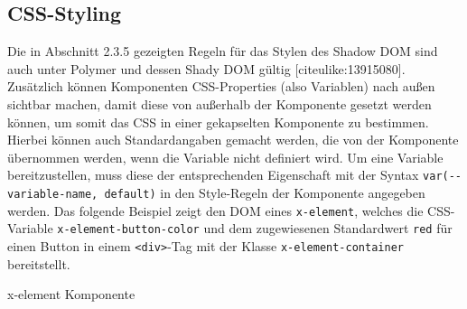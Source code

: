 \begin{Shaded}
\begin{Highlighting}[]
 \OperatorTok{=} \NormalTok{(}\VariableTok{$}\NormalTok{(}\OperatorTok{\{}
  \NormalTok{(}\NormalTok{)}\OperatorTok{;}
  \NormalTok{(}\NormalTok{)}\OperatorTok{;}
\OperatorTok{\}}\NormalTok{)}\OperatorTok{;}
\end{Highlighting}
\end{Shaded}

\subsection{CSS-Styling}\label{css-styling}

Die in Abschnitt 2.3.5 gezeigten Regeln für das Stylen des Shadow DOM
sind auch unter Polymer und dessen Shady DOM gültig
{[}citeulike:13915080{]}. Zusätzlich können Komponenten CSS-Properties
(also Variablen) nach außen sichtbar machen, damit diese von außerhalb
der Komponente gesetzt werden können, um somit das CSS in einer
gekapselten Komponente zu bestimmen. Hierbei können auch Standardangaben
gemacht werden, die von der Komponente übernommen werden, wenn die
Variable nicht definiert wird. Um eine Variable bereitzustellen, muss
diese der entsprechenden Eigenschaft mit der Syntax
\texttt{var(-\/-variable-name,\ default)} in den Style-Regeln der
Komponente angegeben werden. Das folgende Beispiel zeigt den DOM eines
\texttt{x-element}, welches die CSS-Variable
\texttt{x-element-button-color} und dem zugewiesenen Standardwert
\texttt{red} für einen Button in einem
\texttt{\textless{}div\textgreater{}}-Tag mit der Klasse
\texttt{x-element-container} bereitstellt.

x-element Komponente

\begin{Shaded}
\begin{Highlighting}[]
\KeywordTok{>}
       \KeywordTok{\{}
         \NormalTok{)}\KeywordTok{;}
      \KeywordTok{\}}
    \KeywordTok{>}
\end{Highlighting}
\end{Shaded}

